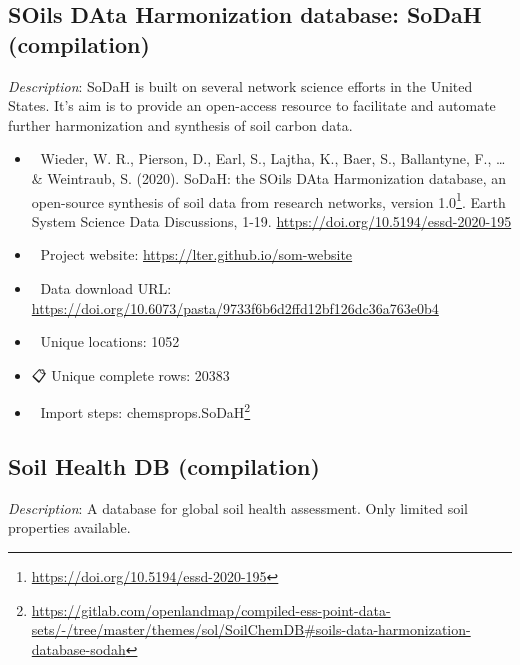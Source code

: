 \documentclass[
  graybox,natbib,nospthms]{svmono}
\providecommand{\tightlist}{%
  \setlength{\itemsep}{0pt}\setlength{\parskip}{0pt}}
\providecommand{\tightlist}{\setlength{\itemsep}{0pt}\setlength{\parskip}{0pt}}
\renewcommand{\href}[2]{#2 (\url{#1})}
\renewcommand{\href}[2]{#2\footnote{\url{#1}}}
\begin{document}
\hypertarget{soils-data-harmonization-database-sodah-compilation}{%
\subsection{SOils DAta Harmonization database: SoDaH (compilation)}\label{soils-data-harmonization-database-sodah-compilation}}

\emph{Description}: SoDaH is built on several network science efforts in the
United States. It's aim is to provide an open-access resource to facilitate and automate further harmonization and synthesis of soil carbon data.

\begin{itemize}
\tightlist
\item
  📕 Wieder, W. R., Pierson, D., Earl, S., Lajtha, K., Baer, S., Ballantyne, F., \ldots{} \& Weintraub, S. (2020). \href{https://doi.org/10.5194/essd-2020-195}{SoDaH: the SOils DAta Harmonization database, an open-source synthesis of soil data from research networks, version 1.0}. Earth System Science Data Discussions, 1-19. \url{https://doi.org/10.5194/essd-2020-195}\\
\item
  🔗 Project website: \url{https://lter.github.io/som-website}\\
\item
  📂 Data download URL: \url{https://doi.org/10.6073/pasta/9733f6b6d2ffd12bf126dc36a763e0b4}\\
\item
  📍 Unique locations: 1052\\
\item
  📋 Unique complete rows: 20383\\
\item
  📝 Import steps: \href{https://gitlab.com/openlandmap/compiled-ess-point-data-sets/-/tree/master/themes/sol/SoilChemDB\#soils-data-harmonization-database-sodah}{chemsprops.SoDaH}
\end{itemize}

\hypertarget{soil-health-db-compilation}{%
\subsection{Soil Health DB (compilation)}\label{soil-health-db-compilation}}

\emph{Description}: A database for global soil health assessment. Only limited soil properties
available.
\end{document}

